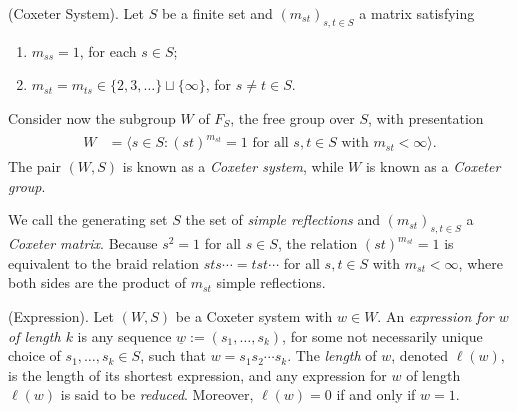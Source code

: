 \noindent\begin{definition}\textnormal{(Coxeter System).} Let $S$ be a finite set and $(m_{st})_{s,t \in S}$ a matrix satisfying
\begin{enumerate}[label=$\bullet$, leftmargin=4\parindent]
\item $m_{ss} = 1$, for each $s \in S$;
\item $m_{st} = m_{ts} \in \{2, 3, \dots\} \sqcup \{\infty\}$, for $s \neq t \in S$.
\end{enumerate}
\noindent Consider now the subgroup $W$ of $F_S$, the free group over $S$, with presentation
\begin{align*}
\begin{split}
W &= \langle s \in S : \text{$(st)^{m_{st}} = 1$ for all $s, t \in S$ with $m_{st} < \infty$}\rangle.%
\end{split}
\end{align*}
\noindent The pair $(W, S)$ is known as a {\em Coxeter system}, while $W$ %
is known as a {\em Coxeter group}.\\
\end{definition}

\noindent We call the generating set $S$ the set of {\em simple reflections} and $(m_{st})_{s,t \in S}$ a {\em Coxeter matrix}. Because $s^2 = 1$ for all $s \in S$, the relation $(st)^{m_{st}} = 1$ is equivalent to the braid relation $sts\cdots = tst\cdots$ for all $s, t \in S$ with $m_{st} < \infty$, where both sides are the product of $m_{st}$ simple reflections.\\

\noindent\begin{definition}\textnormal{(Expression).} Let $(W, S)$ be a Coxeter system with $w \in W$. An {\em expression for $w$ of length $k$} is any sequence $\underline{w} := (s_1, \dots, s_k)$, for some not necessarily unique choice of $s_1, \dots, s_k \in S$, such that $w = s_1 s_2 \cdots s_k$. The {\em length} of $w$, denoted $\ell(w)$, is the length of its shortest expression, and any expression for $w$ of length $\ell(w)$ is said to be {\em reduced}. Moreover, $\ell(w) = 0$ if and only if $w = 1$.\\
\end{definition}

